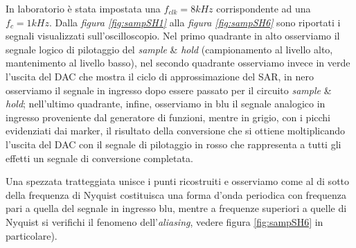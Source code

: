 \documentclass[journal]{IEEEtran}
\begin{document}


In laboratorio è stata impostata una $f_{clk} = 8 kHz$ corrispondente ad una $f_c = 1 kHz$. 
Dalla \textit{figura \ref{fig:sampSH1}} alla \textit{figura \ref{fig:sampSH6}} sono riportati i segnali visualizzati sull'oscilloscopio. 
Nel primo quadrante in alto osserviamo il segnale logico di pilotaggio del \textit{sample} \& \textit{hold} (campionamento al livello alto, mantenimento al livello basso), nel secondo quadrante osserviamo invece in verde l'uscita del DAC che mostra il ciclo di approssimazione del SAR, in nero osserviamo il segnale in ingresso dopo essere passato per il circuito \textit{sample} \& \textit{hold}; nell'ultimo quadrante, infine, osserviamo in blu il segnale analogico in ingresso proveniente dal generatore di funzioni, mentre in grigio, con i picchi evidenziati dai marker, il risultato della conversione che si ottiene moltiplicando l'uscita del DAC con il segnale di pilotaggio in rosso che rappresenta a tutti gli effetti un segnale di conversione completata. 

Una spezzata tratteggiata unisce i punti ricostruiti e osserviamo come al di sotto della frequenza di Nyquist costituisca una forma d'onda periodica con frequenza pari a quella del segnale in ingresso blu, mentre a frequenze superiori a quelle di Nyquist si verifichi il fenomeno dell'\textit{aliasing}, vedere figura \ref{fig:sampSH6} in particolare).
\end{document}
